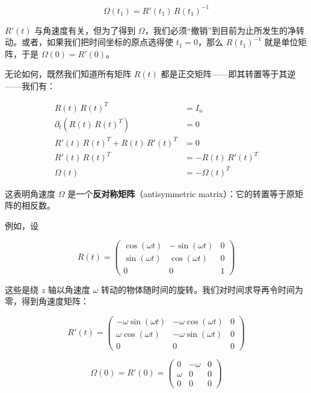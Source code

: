 \begin{equation}
\Omega(t_1) = R'(t_1)\,R(t_1)^{-1}
\end{equation}

$R'(t)$ 与角速度有关，但为了得到 $\Omega$，我们必须“撤销”到目前为止所发生的净转动。或者，如果我们把时间坐标的原点选得使 $t_1=0$，那么 $R(t_1)^{-1}$ 就是单位矩阵，于是 $\Omega(0)=R'(0)$。

无论如何，既然我们知道所有矩阵 $R(t)$ 都是正交矩阵——即其转置等于其逆——我们有：

\begin{align}
R(t)\,R(t)^{T} &= I_n \\
\partial_t\!\left(R(t)\,R(t)^{T}\right) &= 0 \\
R'(t)\,R(t)^{T} + R(t)\,R'(t)^{T} &= 0 \\
R'(t)\,R(t)^{T} &= -R(t)\,R'(t)^{T} \\
\Omega(t) &= -\Omega(t)^{T}
\end{align}

这表明角速度 $\Omega$ 是一个\textbf{反对称矩阵}（antisymmetric matrix）：它的转置等于原矩阵的相反数。

例如，设

\begin{equation}
R(t) = \begin{pmatrix}
\cos(\omega t) & -\sin(\omega t) & 0 \\
\sin(\omega t) & \cos(\omega t) & 0 \\
0 & 0 & 1
\end{pmatrix}
\end{equation}

这些是绕 $z$ 轴以角速度 $\omega$ 转动的物体随时间的旋转。我们对时间求导再令时间为零，得到角速度矩阵：

\begin{equation}
R'(t) = \begin{pmatrix}
-\omega\sin(\omega t) & -\omega\cos(\omega t) & 0 \\
\omega\cos(\omega t) & -\omega\sin(\omega t) & 0 \\
0 & 0 & 0
\end{pmatrix}
\end{equation}

\begin{equation}
\Omega(0) = R'(0) = \begin{pmatrix}
0 & -\omega & 0 \\
\omega & 0 & 0 \\
0 & 0 & 0
\end{pmatrix}
\end{equation}

